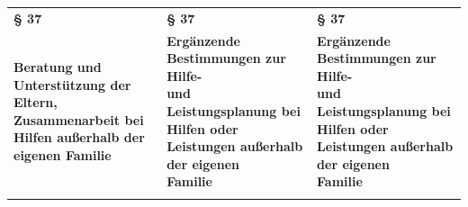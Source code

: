 \documentclass[10pt,a4paper,landscape]{article}
\begin{document}
\begin{longtable}{|L{8.2cm}|L{8.2cm}|L{8.2cm}|}
\hhline{|---|}
\textbf{\S{} 37} & \textbf{\S{} 37 } & \textbf{\S{} 37 } \\
\hhline{|---|}
\textbf{\textcolor{diffred}{Beratung} und \textcolor{diffred}{Unterstützung der Eltern,  \newline Zusammenarbeit} bei Hilfen außerhalb der  \newline eigenen Familie} & \textbf{Ergänzende Bestimmungen zur Hilfe-  \newline und Leistungsplanung bei Hilfen oder  \newline Leistungen außerhalb der eigenen  \newline Familie } & \textbf{Ergänzende Bestimmungen zur Hilfe-  \newline und Leistungsplanung bei Hilfen oder  \newline Leistungen außerhalb der eigenen  \newline Familie } \\
\hhline{|---|}

\end{longtable}
\end{document}
